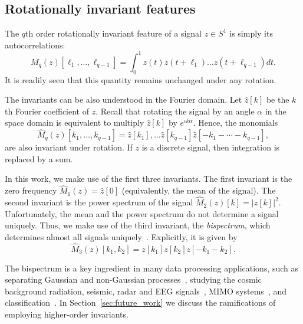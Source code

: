 \documentclass[english,12pt]{article}
\newcommand{\I}{\iota}
\numberwithin{equation}{section}
\numberwithin{thm}{section} %
\begin{document}
\subsection{Rotationally invariant features} \label{sec:invariants}

The $q$th order rotationally invariant feature of a signal $z\in S^1$ is simply its autocorrelations:
\begin{equation}
M_q(z)[\ell_1,\ldots,\ell_{q-1}]=\int_{0}^1 z(t)z(t+\ell_1)\ldots z(t+\ell_{q-1})dt.
\end{equation} 
It is readily seen that this quantity remains unchanged under any rotation. 

The invariants  can be also understood in the Fourier domain.
Let ${\hat{z}[k]}$ be the $k$th Fourier coefficient of $z$. Recall that rotating the signal by an angle $\alpha$ in the space domain is equivalent to multiply ${\hat{z}[k]}$ by $e^{\I k\alpha}$. Hence, the monomials
\begin{equation}
\hat{M}_q(z)[k_1,\ldots,k_{q-1}]=\hat{z}[k_1],\ldots \hat{z}[k_{q-1}]{\hat{z}[-k_1-\cdots-k_{q-1}]},
\end{equation} 
are also invariant under rotation. If $z$ is a discrete signal, then integration is replaced by a sum.

In this work, we make use of the first three invariants. The first invariant is the zero frequency $\hat{M}_1(z) = \hat{z}[0]$ (equivalently, the mean of the signal). The second invariant is the power spectrum of the signal $\hat{M}_2(z)[k]=|z[k]|^2$. Unfortunately, the mean and the power spectrum do not determine a signal uniquely. 
Thus, we make use of the third invariant, the \emph{bispectrum}, which determines almost all signals uniquely~\cite{tukey1953spectral,sadler1992shift}. Explicitly, it is given by
\begin{equation}
\hat{M}_3(z)[k_1,k_2] = z[k_1]z[k_2]z[-k_1-k_2].
\end{equation}


The bispectrum is a key ingredient in many data processing applications, such as separating Gaussian and non-Gaussian processes~\cite{brockett1988bispectral}, studying the cosmic background
radiation, seismic, radar and EEG signals~\cite{wang2000cosmic,chen2008feature,ning1989bispectral}, MIMO systems~\cite{chen2001frequency}, and classification~\cite{zhao2014rotationally}.  
In Section~\ref{sec:future_work} we discuss the ramifications of employing higher-order invariants.  
\end{document}
